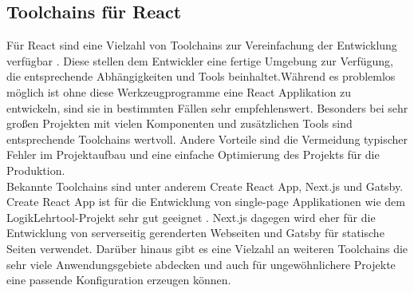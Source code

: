 \subsection{Toolchains für React}
Für React sind eine Vielzahl von Toolchains zur Vereinfachung der Entwicklung verfügbar \cite{11}. Diese stellen dem Entwickler eine fertige Umgebung zur Verfügung, die entsprechende Abhängigkeiten und Tools beinhaltet.Während es problemlos möglich ist ohne diese Werkzeugprogramme eine React Applikation zu entwickeln, sind sie in bestimmten Fällen sehr empfehlenswert. Besonders bei sehr großen Projekten mit vielen Komponenten und zusätzlichen Tools sind entsprechende Toolchains wertvoll. Andere Vorteile sind die Vermeidung typischer Fehler im Projektaufbau und eine einfache Optimierung des Projekts für die Produktion.\\
Bekannte Toolchains sind unter anderem Create React App, Next.js und Gatsby. Create React App ist für die Entwicklung von single-page Applikationen wie dem LogikLehrtool-Projekt sehr gut geeignet \cite{11}. Next.js dagegen wird eher für die Entwicklung von serverseitig gerenderten Webseiten und Gatsby für statische Seiten verwendet. Darüber hinaus gibt es eine Vielzahl an weiteren Toolchains die sehr viele Anwendungsgebiete abdecken und auch für ungewöhnlichere Projekte eine passende Konfiguration erzeugen können.
\clearpage
